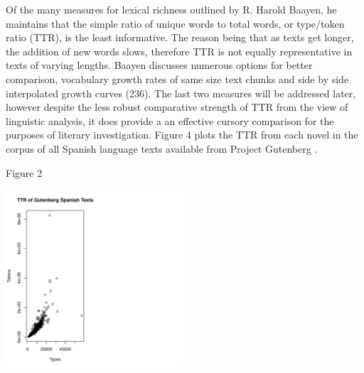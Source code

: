 \documentclass[12pt]{report}\usepackage[]{graphicx}\usepackage[]{color}
\newenvironment{knitrout}{}{} %
\begin{document}
\begin{spacing}{1.9}
Of the many measures for lexical richness outlined by R. Harold Baayen, he maintains that the simple ratio of unique words to total words, or type/token ratio (TTR), is the least informative. 
The reason being that as texts get longer, the addition of new words slows, therefore TTR is not equally representative in texts of varying lengths. 
Baayen discusses numerous options for better comparison, vocabulary growth rates of same size text chunks and side by side interpolated growth curves (236)\nocite{Baayen2008}.
The last two measures will be addressed later, however despite the less robust comparative strength of TTR from the view of linguistic analysis, it does provide a an effective cursory comparison for the purposes of literary investigation. 
Figure 4 plots the TTR from each novel in the corpus of all Spanish language texts available from Project Gutenberg \autocite{Project G}.


Figure 2


\begin{knitrout}
\color{fgcolor}
\includegraphics[width=250,height=250]{figure/Figure_2-1} 

\end{knitrout}



\end{spacing}
\end{document}
